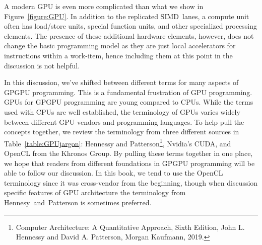 A modern GPU is even more complicated than what we show in Figure~\ref{figure:GPU}.  In addition to
the replicated SIMD~lanes, a compute unit often has load/store units, special function units, and other
specialized processing elements.  The presence of these additional hardware elements, however,
does not change the basic programming model as they are just local accelerators for instructions within a 
work-item, hence including them at this point in the discussion is not helpful.

In this discussion, we've shifted between different terms for many aspects of GPGPU programming.
This is a fundamental frustration of GPU programming. 
GPUs for GPGPU programming are young compared to CPUs.  
While the terms used with CPUs are well established,
the terminology of GPUs varies widely between different GPU vendors and programming
languages.  To help pull the concepts together, we review the terminology from three
different sources in Table~\ref{table:GPUjargon}: Hennessy and 
Patterson\footnote{Computer Architecture: A Quantitative Approach, Sixth Edition, 
John L. Hennessy and David A. Patterson, Morgan Kaufmann, 2019.}, Nvidia's CUDA, 
and OpenCL from the Khronos Group.  By pulling these terms together in one place, we
hope that readers from different foundations in GPGPU programming will be able to follow 
our discussion.  In this book, we tend to use the OpenCL terminology since it was cross-vendor
from the beginning, though when discussion specific features of GPU architecture the terminology 
from Hennesy~and~Patterson is sometimes preferred.

